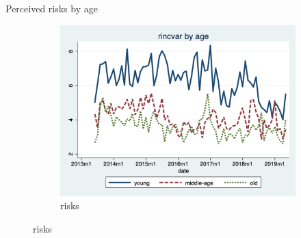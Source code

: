 \documentclass{beamer}
\begin{document}
\begin{frame}{Perceived risks by age}
	\begin{figure}[ht]
		\label{ts_incvar_age_g_mean}
		\begin{subfigure}[b]{0.46\textwidth}
			\centering
			\caption{risks}
			\includegraphics[width=\textwidth, height = 0.33\textheight]{figures/ts_rincvar_age_g_median.png}
		\end{subfigure}
	\end{figure}
 \end{frame}

\end{document}
